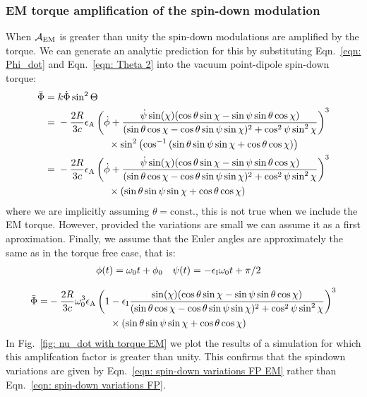 \documentclass[../full_thesis/full_thesis.tex]{subfiles}
\begin{document}
\subsubsection{EM torque amplification of the spin-down modulation}
When $\mathcal{A}_{\mathrm{EM}}$ is greater than unity the spin-down modulations are amplified by
the torque. We can generate an analytic prediction for this by substituting
Eqn.~\eqref{eqn: Phi_dot} and Eqn.~\eqref{eqn: Theta 2} into the vacuum point-dipole spin-down
torque:
\begin{align*}
\ddot{\Phi} = {} & k \dot{\Phi}\sin^{2}\Theta \\
            = {} & -\frac{2R}{3c} \epsA
                   \left(\dot{\phi}
                         +\frac{\dot{\psi}\sin(\chi)
                                (\cos\theta\sin\chi - \sin \psi \sin \theta \cos\chi)
                               }{
                                (\sin\theta \cos \chi - \cos \theta \sin \psi \sin \chi)^{2}
                         + \cos^{2}\psi \sin^{2} \chi}\right)^{3} \\
            &  \hspace{18mm}  \times  \sin^{2}\left(\cos^{-1}\left(
                     \sin\theta\sin\psi\sin\chi + \cos\theta\cos\chi\right)\right)\\
    = {} & -\frac{2R}{3c} \epsA
    \left(\dot{\phi}+\frac{\dot{\psi} \sin(\chi)(\cos\theta\sin\chi
          -\sin \psi \sin \theta \cos\chi)}
         {(\sin\theta \cos \chi - \cos \theta \sin \psi \sin \chi)^{2}
         + \cos^{2}\psi \sin^{2} \chi}\right)^{3} \\
   & \hspace{18mm} \times \left(\sin\theta\sin\psi\sin\chi + \cos\theta\cos\chi\right)
\end{align*}
where we are implicitly assuming $\theta=\mathrm{const.}$, this is not true
when we include the EM torque. However, provided the variations are small we
can assume it as a first aproximation.  Finally, we assume that the Euler angles
are approximately the same as in the torque free case, that is:
\begin{align}
    \phi(t) = \omega_{0}t + \phi_{0} &&& \psi(t) = -\epsilon_{\mathrm{I}} \omega_{0} t + \pi/2
\end{align}

 \begin{align}
\begin{split}
     \ddot{\Phi} =&-\frac{2R}{3c} \omega_{0}^{3}\epsA
     \left(1 -  \epsI\frac{ \sin(\chi)(\cos\theta\sin\chi - \sin \psi \sin \theta \cos\chi)
     }{(\sin\theta \cos \chi - \cos \theta \sin \psi \sin \chi)^{2} + \cos^{2}\psi \sin^{2} \chi}\right)^{3}\\
     &\hspace{22mm}\times\left(\sin\theta\sin\psi\sin\chi + \cos\theta\cos\chi\right)
     \label{eqn: Phi_dot EM}
\end{split}
\end{align}
In Fig.~\ref{fig: nu_dot with torque EM} we plot the results of a simulation
for which this amplifcation factor is greater than unity. This confirms that the
spindown variations are given by Eqn.~\ref{eqn: spin-down variations FP EM} rather
than Eqn.~\eqref{eqn: spin-down variations FP}.
\end{document}
